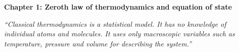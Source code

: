 \renewcommand{\theequation}{1.\arabic{equation}}

\begin{frame}
\begin{center}
{\bf Chapter 1: Zeroth law of thermodynamics and equation of state}\\
\end{center}

\scriptsize

\vspace*{3cm}

\begin{center}
\textit{``Classical thermodynamics is a statistical model. It has no knowledge of individual atoms and molecules. It uses only macroscopic variables such as temperature, pressure and volume for describing the system.''}
\end{center}

\end{frame}

